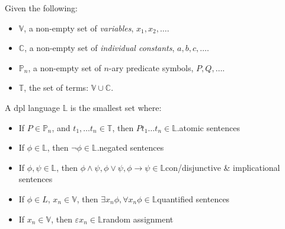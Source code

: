 \documentclass[nols,twoside,nofonts,nobib,nohyper]{tufte-handout}
\providecommand{\tightlist}{%
  \setlength{\itemsep}{0pt}\setlength{\parskip}{0pt}}
\theoremstyle{observation}
\theoremstyle{theorem}
\theoremstyle{corollary}
\theoremstyle{definition}
\begin{document}
\begin{fullwidth}
\begin{tcolorbox}[title=Syntax of \ac{dpl}]
  Given the following:
    \tightlist
  \begin{itemize}
          \tightlist
          \item $\mathbb{V}$, a non-empty set of \textit{variables}, $x_{1},x_{2},…$.
          \item $\mathbb{C}$, a non-empty set of \textit{individual constants}, $a,b,c,…$.
          \item $\mathbb{P}_{n}$, a non-empty set of $n$-ary predicate symbols, $P,Q,…$.
          \item $\mathbb{T}$, the set of terms: $\mathbb{V} ∪ \mathbb{C}$.
  \end{itemize}
  \tcblower
  A \ac{dpl} language $\mathbb{L}$ is the smallest set where:
  \begin{itemize}
          \tightlist
          \item If $P ∈ \mathbb{P}_{n}$, and $t_1,…t_{n} ∈ \mathbb{T}$, then $P t_{1} … t_{n} ∈ \mathbb{L}$.\hfill atomic sentences
          \item If $ϕ ∈ \mathbb{L}$, then $¬ ϕ ∈ \mathbb{L}$.\hfill negated sentences
          \item If $ϕ,ψ ∈ \mathbb{L}$, then $ϕ ∧ ψ, ϕ ∨ ψ, ϕ → ψ ∈ \mathbb{L}$\hfill con/disjunctive \& implicational sentences
          \item If $ϕ ∈ L$, $x_{n} ∈ \mathbb{V}$, then $∃x_{n} ϕ, ∀x_{n} ϕ ∈ \mathbb{L}$\hfill quantified sentences
          \item If $x_{n} ∈ \mathbb{V}$, then $εx_{n} ∈ \mathbb{L}$\hfill random assignment
  \end{itemize}
\end{tcolorbox}
\end{fullwidth}
\end{document}
